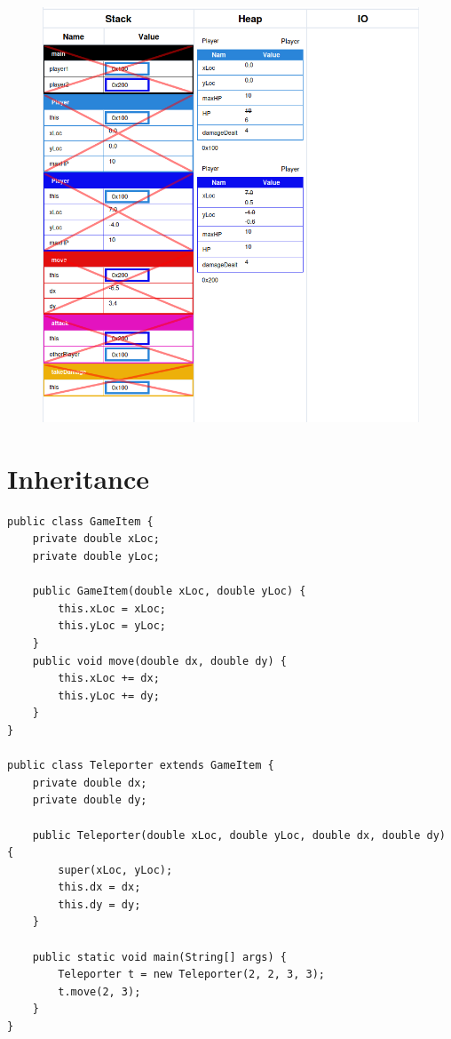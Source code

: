 \documentclass{article}
\begin{document}
\begin{figure}[H]
	\centering
	\includegraphics{classes.png}
\end{figure}

\pagebreak


\section{Inheritance}

\begin{verbatim}
public class GameItem {
    private double xLoc;
    private double yLoc;

    public GameItem(double xLoc, double yLoc) {
        this.xLoc = xLoc;
        this.yLoc = yLoc;
    }
    public void move(double dx, double dy) {
        this.xLoc += dx;
        this.yLoc += dy;
    }
}

public class Teleporter extends GameItem {
    private double dx;
    private double dy;

    public Teleporter(double xLoc, double yLoc, double dx, double dy) {
        super(xLoc, yLoc);
        this.dx = dx;
        this.dy = dy;
    }

    public static void main(String[] args) {
        Teleporter t = new Teleporter(2, 2, 3, 3);
        t.move(2, 3);
    }
}
\end{verbatim}
\end{document}
